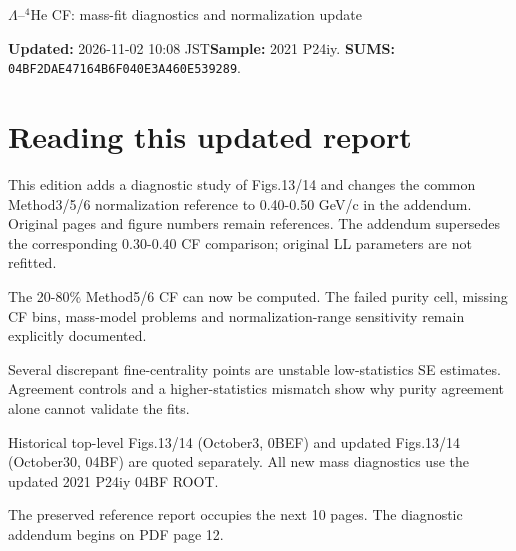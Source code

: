 \documentclass[10pt,a4paper]{article}
\begin{document}
\begin{center}{\Large $\Lambda$--$^{4}$He CF: mass-fit diagnostics and normalization update}\end{center}
\textbf{Updated:} 2026-11-02 10:08 JST\quad\textbf{Sample:} 2021 P24iy.
\textbf{SUMS:} \texttt{04BF2DAE47164B6F040E3A460E539289}.
\section*{Reading this updated report}
This edition adds a diagnostic study of Figs.13/14 and changes the common Method3/5/6 normalization reference to 0.40-0.50 GeV/c in the addendum. Original pages and figure numbers remain references. The addendum supersedes the corresponding 0.30-0.40 CF comparison; original LL parameters are not refitted.

The 20-80\% Method5/6 CF can now be computed. The failed purity cell, missing CF bins, mass-model problems and normalization-range sensitivity remain explicitly documented.

Several discrepant fine-centrality points are unstable low-statistics SE estimates. Agreement controls and a higher-statistics mismatch show why purity agreement alone cannot validate the fits.

Historical top-level Figs.13/14 (October3, 0BEF) and updated Figs.13/14 (October30, 04BF) are quoted separately. All new mass diagnostics use the updated 2021 P24iy 04BF ROOT.

The preserved reference report occupies the next 10 pages. The diagnostic addendum begins on PDF page 12.
\clearpage


\end{document}
